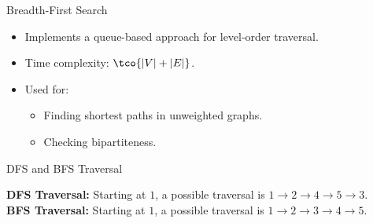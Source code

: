 \begin{properties}[]{Breadth-First Search}
    \begin{itemize}
        \item Implements a queue-based approach for level-order traversal.
        \item Time complexity: $\tco{|V| + |E|}$.
        \item Used for:
              \begin{itemize}
                  \item Finding shortest paths in unweighted graphs.
                  \item Checking bipartiteness.
              \end{itemize}
    \end{itemize}
\end{properties}

\begin{example}[]{DFS and BFS Traversal}
    \begin{center}
    \end{center}
    \textbf{DFS Traversal:} Starting at $1$, a possible traversal is $1 \to 2 \to 4 \to 5 \to 3$.\\
    \textbf{BFS Traversal:} Starting at $1$, a possible traversal is $1 \to 2 \to 3 \to 4 \to 5$.
\end{example}
